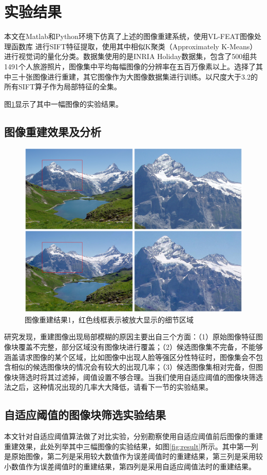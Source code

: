 \section{实验结果}
本文在Matlab和Python环境下仿真了上述的图像重建系统，使用VL-FEAT图像处理函数库
\cite{vl_feat}进行SIFT特征提取，使用其中相似K聚类（Approximately K-Means）进行视觉词的量化分类。数据集使用的是INRIA Holiday数据集\cite{INRIA}，包含了500组共1491个人旅游照片，图像集中平均每幅图像的分辨率在五百万像素以上。选择了其中三十张图像进行重建，其它图像作为大图像数据集进行训练。以尺度大于3.2的所有SIFT算子作为局部特征的全集。

图\ref{fig:detail_result}显示了其中一幅图像的实验结果。
\subsection{图像重建效果及分析}
\begin{figure}
\centering\includegraphics[width=15cm]{imgs/ch4/detail_result}
\caption{图像重建结果1，红色线框表示被放大显示的细节区域}
\label{fig:detail_result}
\end{figure}

研究发现，重建图像出现局部模糊的原因主要出自三个方面：（1）原始图像特征图像块覆盖不完整，部分区域没有图像块进行覆盖；（2）候选图像集不完备，不能够涵盖请求图像的某个区域，比如图像中出现人脸等强区分性特征时，图像集会不包含相似的候选图像块的情况会有较大的出现几率；（3）候选图像集相对完备，但图像块筛选时将其过滤掉，阈值设置不够合理。当我们使用自适应阈值的图像块筛选法之后，这种情况出现的几率大大降低，请看下一节的实验结果。

\subsection{自适应阈值的图像块筛选实验结果}
本文针对自适应阈值算法做了对比实验，分别勘察使用自适应阈值前后图像的重建重建效果，此处列举其中三幅图像的实验结果，如图\ref{fig:result}所示。其中第一列是原始图像，第二列是采用较大数值作为误差阈值时的重建结果，第三列是采用较小数值作为误差阈值时的重建结果，第四列是采用自适应阈值法时的重建结果。

